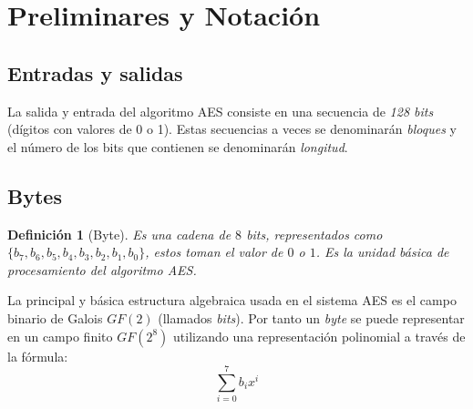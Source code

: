 \documentclass[peerreview]{IEEEtran}
\newtheorem{defin}{\textbf{Definición}}
\begin{document}
\section{Preliminares y Notaci\'on}
\subsection{Entradas y salidas}
La salida y entrada del algoritmo AES consiste en una secuencia de \textit{128
  bits} (dígitos con valores de 0 o 1). Estas secuencias a veces se denominarán
\textit{bloques} y el número de
los bits que contienen se denominarán \textit{longitud}.
\subsection{Bytes}
\begin{defin}[Byte]
  Es una cadena de $8$ \textit{bits}, representados como $\{b_7, b_6, b_5,
    b_4, b_3, b_2, b_1, b_0\}$, estos toman el valor de $0$ o $1$. Es la unidad
  básica de procesamiento del algoritmo AES.\\
\end{defin}

La principal y básica estructura algebraica usada en el sistema AES es el campo
binario de Galois $GF(2)$ (llamados \textit{bits}). Por tanto un \textit{byte}
se puede representar en un campo finito $GF(2^8)$ utilizando una representación
polinomial a través de la fórmula:
\[\sum_{i=0}^{7}b_{i}x^{i}\]
\end{document}
